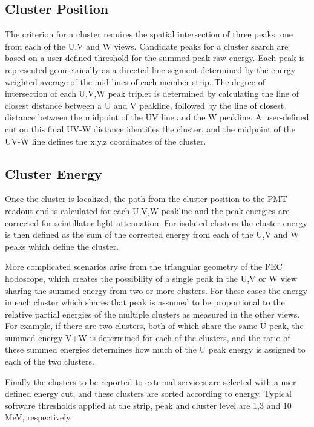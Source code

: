 \subsection {Cluster Position}
The criterion for a cluster requires the spatial intersection of three peaks, one from each of the U,V and W views.  Candidate peaks for a cluster search are based on a user-defined threshold for the summed peak raw energy.  Each peak is represented geometrically as a directed line segment determined by the energy weighted average of the mid-lines of each member strip.   The degree of intersection of each U,V,W peak triplet is determined by calculating the line of closest distance between a U and V peakline, followed by the line of closest distance between the midpoint of the UV line and the W peakline.  A user-defined cut on this final UV-W distance identifies the cluster, and the midpoint of the UV-W line defines the x,y,z coordinates of the cluster.  

\subsection {Cluster Energy}

Once the cluster is localized, the path from the cluster position to the PMT readout end is calculated for each U,V,W peakline and the peak energies are corrected for scintillator light attenuation.  For isolated clusters the cluster energy is then defined as the sum of the corrected energy from each of the U,V and W peaks which define the cluster.  

More complicated scenarios arise from the triangular geometry of the FEC hodoscope, which creates the possibility of a single peak in the U,V or W view sharing the summed energy from two or more clusters.  For these cases the energy in each cluster which shares that peak is assumed to be proportional to the relative partial energies of the multiple clusters as measured in the other views.  For example, if there are two clusters, both of which share the same U peak, the summed energy V+W is determined for each of the clusters, and the ratio of these summed energies determines how much of the U peak energy is  assigned to each of the two clusters.  

Finally the clusters to be reported to external services are selected with a user-defined energy cut, and these clusters are sorted according to energy. Typical software thresholds applied at the strip, peak and cluster level are 1,3 and 10 MeV, respectively. 

